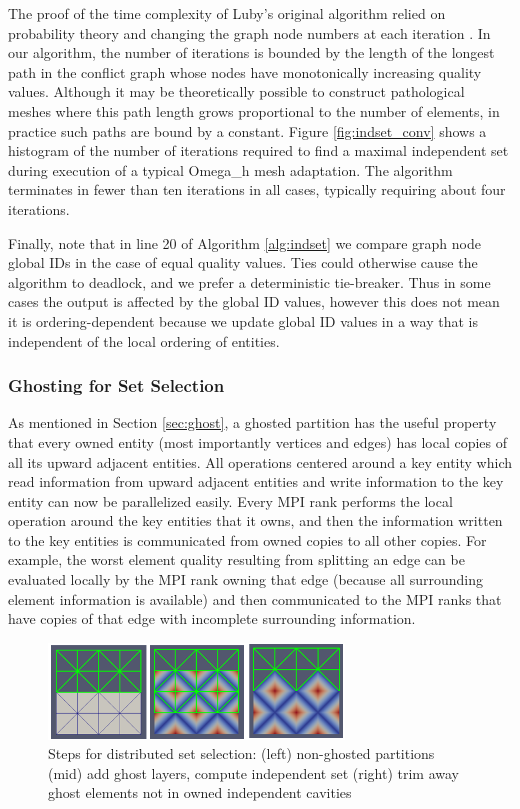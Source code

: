The proof of the time complexity of Luby's original algorithm
relied on probability theory and changing
the graph node numbers at each iteration \cite{luby1986simple}.
In our algorithm, the number of iterations is bounded by the
length of the longest path in the conflict graph whose nodes have monotonically
increasing quality values.
Although it may be theoretically possible to construct pathological
meshes where this path length grows proportional to the number of elements,
in practice such paths are bound by a constant.
Figure \ref{fig:indset_conv} shows a histogram of the number of
iterations required to find a maximal independent set during execution
of a typical Omega\_h mesh adaptation.
The algorithm terminates in fewer than ten iterations in all cases,
typically requiring about four iterations.

Finally, note that in line 20 of Algorithm \ref{alg:indset} we
compare graph node global IDs in the case of equal quality values.
Ties could otherwise cause the algorithm to deadlock, and we
prefer a deterministic tie-breaker.
Thus in some cases the output is affected by the global ID values,
however this does not mean it is ordering-dependent because
we update global ID values in a way that is independent
of the local ordering of entities.

\subsubsection{Ghosting for Set Selection}
\label{sec:indset_ghost}

As mentioned in Section \ref{sec:ghost}, a ghosted partition has
the useful property that every owned entity
(most importantly vertices and edges) has local copies
of all its upward adjacent entities.
All operations centered around a key entity which read information
from upward adjacent entities and write information to the
key entity can now be parallelized easily.
Every MPI rank performs the local operation around the key entities
that it owns, and then the information written to the key entities
is communicated from owned copies to all other copies.
For example, the worst element quality resulting from splitting an
edge can be evaluated locally by the MPI rank owning that edge
(because all surrounding element information is available)
and then communicated to the MPI ranks that have copies of that edge
with incomplete surrounding information.

\begin{figure}[t]\vspace*{4pt}
\centerline{
\includegraphics[width=0.7\textwidth]{mpi_indset.png}}
\caption{Steps for distributed set selection:
(left) non-ghosted partitions
(mid) add ghost layers, compute independent set
(right) trim away ghost elements not in owned independent
cavities}\vspace*{-6pt}
\label{fig:mpi_indset}
\end{figure}

